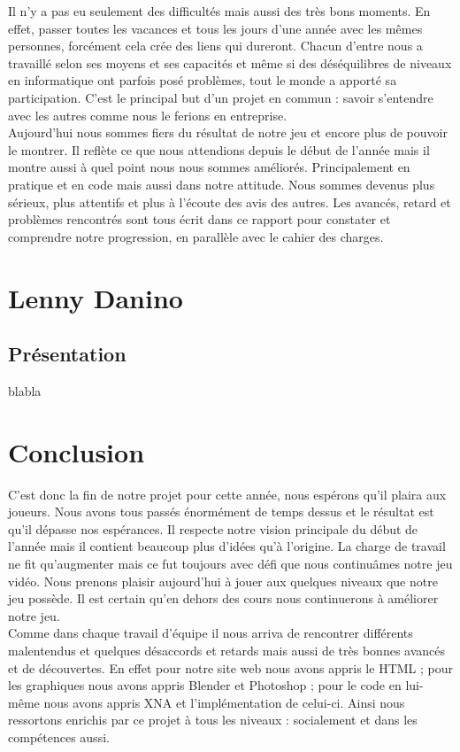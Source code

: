 \documentclass[12pt]{article}
\begin{document}
Il n’y a pas eu seulement des difficultés mais aussi des très bons moments. En effet, passer toutes les vacances et tous les jours  d’une année avec les mêmes personnes, forcément cela crée des liens qui dureront. Chacun d’entre nous a travaillé selon ses moyens et ses capacités et même si des déséquilibres de niveaux en informatique ont parfois posé problèmes, tout le monde a apporté sa participation. C’est le principal but d’un projet en commun : savoir s’entendre avec les autres comme nous le ferions en entreprise.\\

Aujourd’hui nous sommes fiers du résultat  de notre jeu et encore plus de pouvoir le montrer. Il reflète ce que nous attendions depuis le début de l’année mais il montre aussi à quel point nous nous sommes améliorés. Principalement en pratique et en code mais aussi dans notre attitude. Nous sommes devenus plus sérieux, plus attentifs et plus à l'écoute des avis des autres. Les avancés, retard et problèmes rencontrés sont tous écrit dans ce rapport pour constater et comprendre notre progression, en parallèle avec le cahier des charges.\\

\newpage
\setcounter{page}{1} 
\section{Lenny Danino}

\subsection{Présentation}

blabla

\newpage
\thispagestyle{empty}
\pagestyle{fancyplain} \chead{} 
\listoffigures

\newpage
\setcounter{page}{1} 
\section{Conclusion}

C’est donc la fin de notre projet pour cette année, nous espérons qu’il plaira aux joueurs. Nous avons tous passés énormément de temps dessus et le résultat est qu’il dépasse nos espérances. Il respecte notre vision principale du début de l’année mais il contient beaucoup plus d’idées qu’à l’origine. La charge de travail ne fit qu’augmenter mais ce fut toujours avec défi que nous continuâmes  notre jeu vidéo.  Nous prenons plaisir aujourd’hui à jouer aux quelques niveaux que notre jeu possède. Il est certain qu’en dehors des cours nous continuerons à améliorer notre jeu.\\

Comme dans chaque travail d’équipe il nous arriva de rencontrer différents malentendus et quelques désaccords et retards mais aussi de très bonnes avancés et de découvertes. En effet pour notre site web nous avons appris le HTML ; pour les graphiques nous avons appris Blender et Photoshop ; pour le code en lui-même nous avons appris XNA et l’implémentation de celui-ci. Ainsi nous ressortons enrichis par ce projet à tous les niveaux : socialement et dans les compétences aussi.\\
\end{document}

